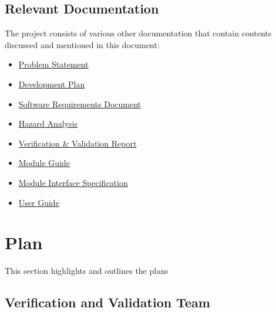 \documentclass[12pt, titlepage]{article}
\begin{document}
\subsection{Relevant Documentation}
The project consists of various other documentation that contain contents discussed and mentioned in this document:
\begin{itemize}
    \item \href{https://github.com/brandonduong/Farming-Matters/blob/main/docs/ProblemStatementAndGoals/ProblemStatement.pdf}{Problem Statement}
    \item \href{https://github.com/brandonduong/Farming-Matters/blob/main/docs/ProblemStatementAndGoals/ProblemStatement.pdf}{Development Plan}
    \item \href{https://github.com/brandonduong/Farming-Matters/blob/main/docs/DevelopmentPlan/DevelopmentPlan.pdf}{Software Requirements Document}
    \item \href{https://github.com/brandonduong/Farming-Matters/blob/main/docs/HazardAnalysis/HazardAnalysis.pdf}{Hazard Analysis}
    \item \href{https://github.com/brandonduong/Farming-Matters/blob/main/docs/VnVReport/VnVReport.pdf}{Verification \&  Validation Report}
    \item \href{https://github.com/brandonduong/Farming-Matters/blob/main/docs/Design/MG/MG.pdf}{Module Guide}
    \item \href{https://github.com/brandonduong/Farming-Matters/blob/main/docs/Design/MIS/MIS.pdf}{Module Interface Specification}
    \item \href{https://github.com/brandonduong/Farming-Matters/blob/main/docs/UserGuide/UserGuide.pdf}{User Guide}
\end{itemize}



\section{Plan}
This section highlights and outlines the plans 

\subsection{Verification and Validation Team}
\end{document}

